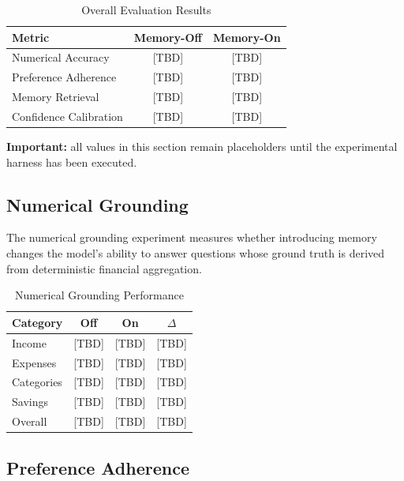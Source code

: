 \documentclass[conference]{IEEEtran}
\begin{document}
    \begin{table}[t]
    \centering
    \caption{Overall Evaluation Results}
    \label{tab:results}
    \begin{tabular}{lcc}
    \toprule
    \textbf{Metric} & \textbf{Memory-Off} & \textbf{Memory-On} \\
    \midrule
    Numerical Accuracy & [TBD] & [TBD] \\
    Preference Adherence & [TBD] & [TBD] \\
    Memory Retrieval & [TBD] & [TBD] \\
    Confidence Calibration & [TBD] & [TBD] \\
    \bottomrule
    \end{tabular}
    \end{table}
    
    \textbf{Important:} all values in this section remain placeholders until
    the experimental harness has been executed.
    
    \subsection{Numerical Grounding}
    
    The numerical grounding experiment measures whether introducing memory
    changes the model's ability to answer questions whose ground truth is
    derived from deterministic financial aggregation.
    
    \begin{table}[t]
    \centering
    \caption{Numerical Grounding Performance}
    \label{tab:numerical}
    \begin{tabular}{lccc}
    \toprule
    \textbf{Category} & \textbf{Off} & \textbf{On} & \textbf{$\Delta$} \\
    \midrule
    Income & [TBD] & [TBD] & [TBD] \\
    Expenses & [TBD] & [TBD] & [TBD] \\
    Categories & [TBD] & [TBD] & [TBD] \\
    Savings & [TBD] & [TBD] & [TBD] \\
    Overall & [TBD] & [TBD] & [TBD] \\
    \bottomrule
    \end{tabular}
    \end{table}
    
    \subsection{Preference Adherence}
    
\end{document}
